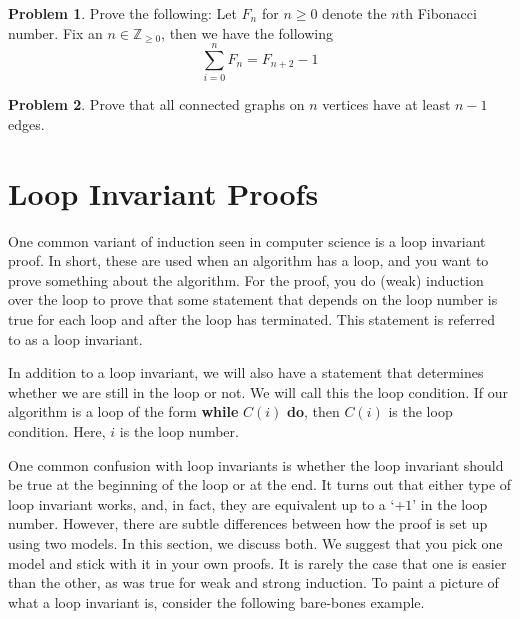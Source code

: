 \documentclass{article}
\newcommand{\ZZ}{\mathbb{Z}_{\geq 0}}
\theoremstyle{plain}
\theoremstyle{definition}
\newtheorem{problem}{Problem}
\begin{document}
\begin{problem}
    Prove the following: Let \(F_n\) for \(n \geq 0\) denote the \(n\)th Fibonacci number. Fix an \(n \in \ZZ\), then we have the following
    \[\sum_{i = 0}^n F_n = F_{n+2} - 1\]
\end{problem}

\begin{problem}
    Prove that all connected graphs on \(n\) vertices have at least \(n-1\) edges.
\end{problem}

\section{Loop Invariant Proofs}\label{sec_loop_inv}

One common variant of induction seen in computer science is a loop invariant proof. In short, these are used when an algorithm has a loop, and you want to prove something about the algorithm. For the proof, you do (weak) induction over the loop to prove that some statement that depends on the loop number is true for each loop and after the loop has terminated. This statement is referred to as a loop invariant.

In addition to a loop invariant, we will also have a statement that determines whether we are still in the loop or not. We will call this the loop condition. If our algorithm is a loop of the form \textbf{while} \(C(i)\) \textbf{do}, then \(C(i)\) is the loop condition. Here, \(i\) is the loop number.

One common confusion with loop invariants is whether the loop invariant should be true at the beginning of the loop or at the end. It turns out that either type of loop invariant works, and, in fact, they are equivalent up to a `\(+1\)' in the loop number. However, there are subtle differences between how the proof is set up using two models. In this section, we discuss both. We suggest that you pick one model and stick with it in your own proofs. It is rarely the case that one is easier than the other, as was true for weak and strong induction. To paint a picture of what a loop invariant is, consider the following bare-bones example.
\end{document}

